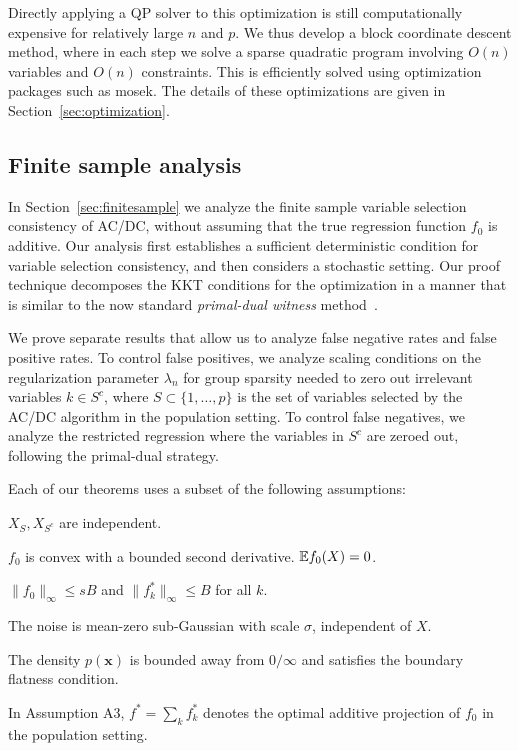Directly applying a QP solver to this optimization is still computationally
expensive for relatively large
$n$ and $p$.  We thus develop a block
coordinate descent method, where in each step we solve a sparse
quadratic program involving $O(n)$ variables and $O(n)$ constraints.  This 
is efficiently solved using optimization packages 
such as {\sc mosek}.  The details of these optimizations
are given in Section~\ref{sec:optimization}.


\subsection{Finite sample analysis}


In Section~\ref{sec:finitesample} 
we analyze the finite sample variable selection consistency of AC/DC, without assuming that the true
regression function $f_0$ is additive. Our analysis first establishes
a sufficient deterministic condition for variable selection 
consistency, and then considers a stochastic setting.
Our proof technique decomposes the KKT conditions for the optimization
in a manner that is similar to the now standard \emph{primal-dual
  witness} method~\citep{wainwright2009sharp}. 

We prove separate results that allow us to analyze false negative
rates and false positive rates.  To control false positives,
we analyze scaling conditions on the regularization parameter
$\lambda_n$ for 
group sparsity needed to zero out irrelevant variables
$k \in S^c$, where $S\subset \{1,\ldots, p\}$ is the set of
variables selected by the AC/DC algorithm in the population setting.
To control false negatives, we analyze the restricted regression
where the variables in $S^c$ are zeroed out, following the primal-dual
strategy.  



Each of our theorems uses a subset of the following assumptions:
\begin{packed_enum}
\item[A1:] $X_S, X_{S^c}$ are independent. 
\item[A2:] $f_0$ is convex with a bounded second derivative. ${\mathbb E} f_0(X) = 0$.
\item[A3:] $\|f_0\|_\infty \leq sB$ and $\|f^*_k \|_\infty \leq B$ for all $k$.
\item[A4:] The noise is mean-zero sub-Gaussian with scale $\sigma$, independent of $X$.
\item[A5:] The density $p(\mathbf{x})$ is bounded away from $0/\infty$ and satisfies the boundary flatness condition.
\end{packed_enum}
In Assumption A3, $f^*=\sum_k f^*_k$ denotes the optimal additive projection of $f_0$ in the population setting.

